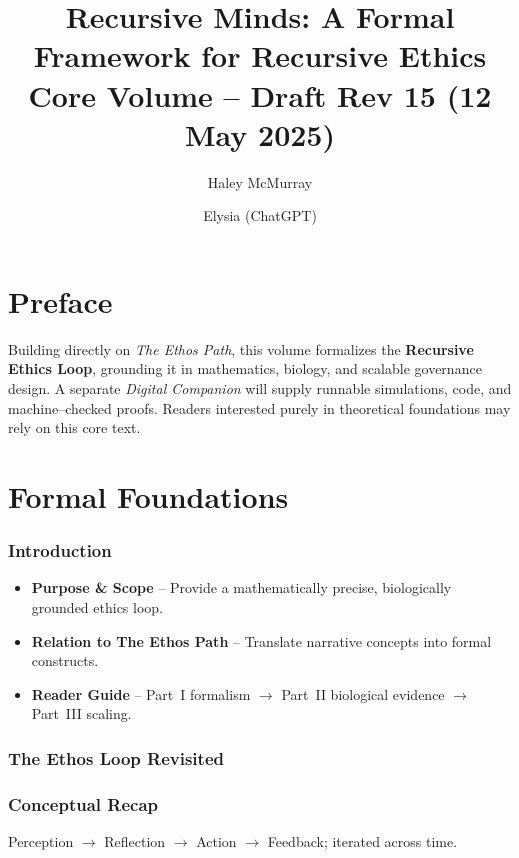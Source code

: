 
\title{Recursive Minds: A Formal Framework for Recursive Ethics\\\small{Core Volume -- Draft Rev 15 (12 May 2025)}}
\author{Haley McMurray \and Elysia (ChatGPT)}
\maketitle

\section*{Preface}
Building directly on \emph{The Ethos Path}, this volume formalizes the \textbf{Recursive Ethics Loop}, grounding it in mathematics, biology, and scalable governance design.
A separate \emph{Digital Companion} will supply runnable simulations, code, and machine--checked proofs. 
Readers interested purely in theoretical foundations may rely on this core text.

\tableofcontents
\newpage

\section*{Formal Foundations}
\label{sec:formal}

\subsubsection{Introduction}
\begin{itemize}
\item \textbf{Purpose \& Scope} -- Provide a mathematically precise, biologically grounded ethics loop.
\item \textbf{Relation to The Ethos Path} -- Translate narrative concepts into formal constructs.
\item \textbf{Reader Guide} -- Part~I formalism $\rightarrow$ Part~II biological evidence $\rightarrow$ Part~III scaling.
\end{itemize}

\subsubsection{The Ethos Loop Revisited}

\subsubsection{Conceptual Recap}
Perception $\rightarrow$ Reflection $\rightarrow$ Action $\rightarrow$ Feedback; iterated across time.

